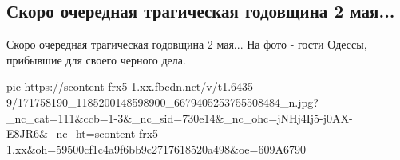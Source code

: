  
 
 
 
 
\subsection{Скоро очередная трагическая годовщина 2 мая...}

Скоро очередная трагическая годовщина 2 мая...
На фото - гости Одессы, прибывшие для своего черного дела.

\ifcmt
  pic https://scontent-frx5-1.xx.fbcdn.net/v/t1.6435-9/171758190_1185200148598900_6679405253755508484_n.jpg?_nc_cat=111&ccb=1-3&_nc_sid=730e14&_nc_ohc=jNHj4Ij5-j0AX-E8JR6&_nc_ht=scontent-frx5-1.xx&oh=59500cf1c4a9f6bb9c2717618520a498&oe=609A6790
\fi

